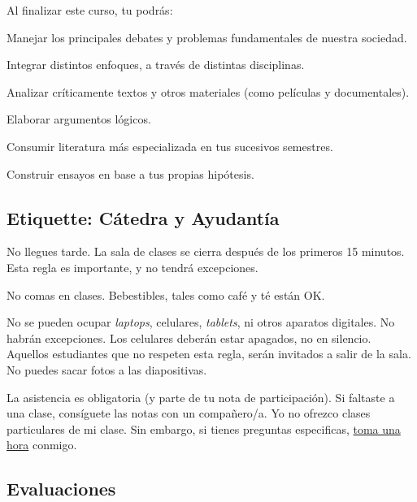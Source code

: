 \documentclass[letterpaper]{article}
\renewenvironment{itemize}{
  \begin{list}{}{
    \setlength{\leftmargin}{1.5em}
  }
}{
  \end{list}
}
\begin{document}
Al finalizar este curso, tu podr\'as:

\begin{itemize}
	\item[$\bullet$] Manejar los principales debates y problemas fundamentales de nuestra sociedad. 
	\item[$\bullet$] Integrar distintos enfoques, a trav\'es de distintas disciplinas.
	\item[$\bullet$] Analizar cr\'iticamente textos y otros materiales (como pel\'iculas y documentales).
	\item[$\bullet$] Elaborar argumentos l\'ogicos.
	\item[$\bullet$] Consumir literatura m\'as especializada en tus sucesivos semestres.
  \item[$\bullet$] Construir ensayos en base a tus propias hip\'otesis.
\end{itemize}


\subsection*{Etiquette: C\'atedra y Ayudant\'ia}
 

\begin{itemize}
	\item[$\bullet$] No llegues tarde. La sala de clases se cierra despu\'es de los primeros 15 minutos. Esta regla es importante, y no tendr\'a excepciones.
	\item[$\bullet$] No comas en clases. Bebestibles, tales como caf\'e y t\'e est\'an OK.
	\item[$\bullet$] No se pueden ocupar \emph{laptops}, celulares, \emph{tablets}, ni otros aparatos digitales. No habr\'an excepciones. Los celulares deber\'an estar apagados, no en silencio. Aquellos estudiantes que no respeten esta regla, ser\'an invitados a salir de la sala. No puedes sacar fotos a las diapositivas.
	\item[$\bullet$] La asistencia es obligatoria (y parte de tu nota de participaci\'on). Si faltaste a una clase, cons\'iguete las notas con un compa\~nero/a. Yo no ofrezco clases particulares de mi clase. Sin embargo, si tienes preguntas especificas, \href{https://calendly.com/bahamonde/officehours}{toma una hora} conmigo. 
\end{itemize}




\subsection*{Evaluaciones}
\end{document}
